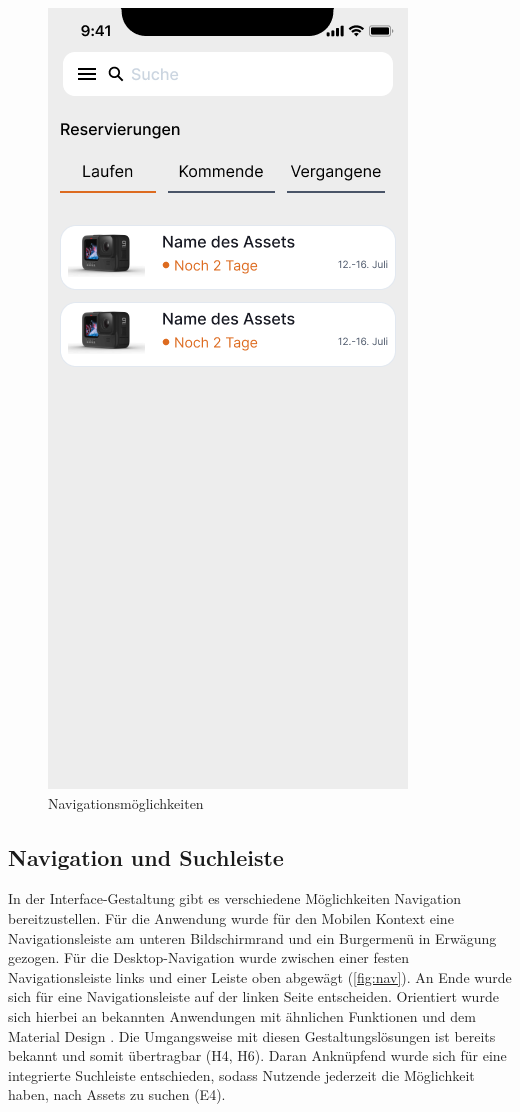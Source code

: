 \begin{figure}[h]
    \includegraphics[scale=0.4]{Bilder/Prototyp/Neu/V2.png}
    \caption[-]{Navigationsmöglichkeiten}
    \label{fig:home}
\end{figure}

\subsection{Navigation und Suchleiste}
In der Interface-Gestaltung gibt es verschiedene Möglichkeiten Navigation bereitzustellen. Für die
Anwendung wurde für den Mobilen Kontext eine Navigationsleiste am unteren Bildschirmrand und ein
Burgermenü in Erwägung gezogen. Für die Desktop-Navigation wurde zwischen einer festen
Navigationsleiste links und einer Leiste oben abgewägt (\ref{fig:nav}). An Ende wurde sich für eine
Navigationsleiste auf der linken Seite entscheiden. Orientiert wurde sich hierbei an bekannten
Anwendungen mit ähnlichen Funktionen und dem Material Design \cite{google_material_2022}. Die
Umgangsweise mit diesen Gestaltungslösungen ist bereits bekannt und somit übertragbar (H4, H6).
Daran Anknüpfend wurde sich für eine integrierte Suchleiste entschieden, sodass Nutzende jederzeit
die Möglichkeit haben, nach Assets zu suchen \cite{google_material_2022} (E4).


